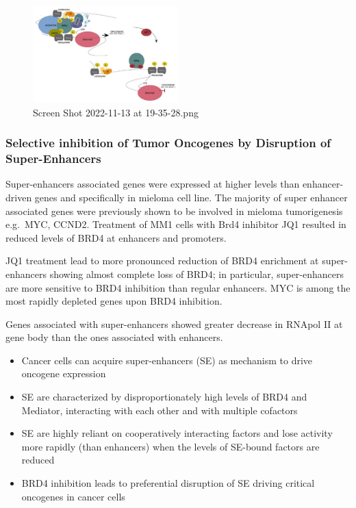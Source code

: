 \begin{figure}
\centering
\includegraphics[width=0.5\textwidth]{../_resources/Screen_Shot_2022-11-13_at_19-35-28.png}
\caption{Screen Shot 2022-11-13 at 19-35-28.png}
\end{figure}

\hypertarget{selective-inhibition-of-tumor-oncogenes-by-disruption-of-super-enhancers}{%
\subsubsection{Selective inhibition of Tumor Oncogenes by Disruption of Super-Enhancers}\label{selective-inhibition-of-tumor-oncogenes-by-disruption-of-super-enhancers}}

Super-enhancers associated genes were expressed at higher levels than enhancer-driven genes and specifically in mieloma cell line. The majority of super enhancer associated genes were previously shown to be involved in mieloma tumorigenesis e.g.~MYC, CCND2. Treatment of MM1 cells with Brd4 inhibitor JQ1 resulted in reduced levels of BRD4 at enhancers and promoters.

JQ1 treatment lead to more pronounced reduction of BRD4 enrichment at super- enhancers showing almost complete loss of BRD4; in particular, super-enhancers are more sensitive to BRD4 inhibition than regular enhancers. MYC is among the most rapidly depleted genes upon BRD4 inhibition.

Genes associated with super-enhancers showed greater decrease in RNApol II at gene body than the ones associated with enhancers.

\begin{itemize}
\tightlist
\item
  Cancer cells can acquire super-enhancers (SE) as mechanism to drive oncogene expression
\item
  SE are characterized by disproportionately high levels of BRD4 and Mediator, interacting with each other and with multiple cofactors
\item
  SE are highly reliant on cooperatively interacting factors and lose activity more rapidly (than enhancers) when the levels of SE-bound factors are reduced
\item
  BRD4 inhibition leads to preferential disruption of SE driving critical oncogenes in cancer cells
\end{itemize}

